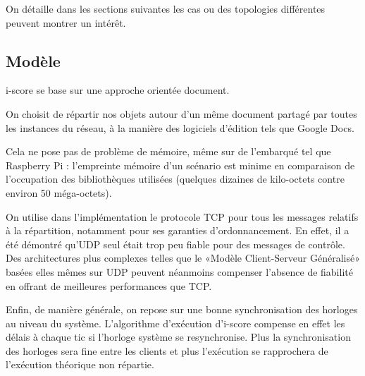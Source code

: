 \documentclass{article}
\begin{document}
On détaille dans les sections suivantes les cas ou des topologies différentes peuvent montrer un intérêt.



\subsection{Modèle}
i-score se base sur une approche orientée document.

On choisit de répartir nos objets autour d'un même document partagé par toutes les instances du réseau, 
à la manière des logiciels d'édition tels que Google Docs. %

Cela ne pose pas de problème de mémoire, même sur de l'embarqué tel que Raspberry Pi : l'empreinte mémoire d'un scénario est minime en comparaison de l'occupation des bibliothèques utilisées (quelques dizaines de kilo-octets contre environ 50 méga-octets).

On utilise dans l'implémentation le protocole TCP pour tous les messages relatifs à la répartition, notamment pour ses garanties d'ordonnancement.
En effet, il a été démontré qu'UDP seul était trop peu fiable pour des messages de contrôle. 
Des architectures plus complexes telles que le «Modèle Client-Serveur Généralisé» basées elles mêmes sur UDP peuvent néanmoins compenser l'absence de fiabilité\cite{mckinney2012oscthulhu} en offrant de meilleures performances que TCP.




Enfin, de manière générale, on repose sur une bonne synchronisation des horloges au niveau du système.
L'algorithme d'exécution d'i-score compense en effet les délais à chaque tic si l'horloge système se resynchronise.
Plus la synchronisation des horloges sera fine entre les clients et plus l'exécution se rapprochera de l'exécution théorique non répartie.
\end{document}
